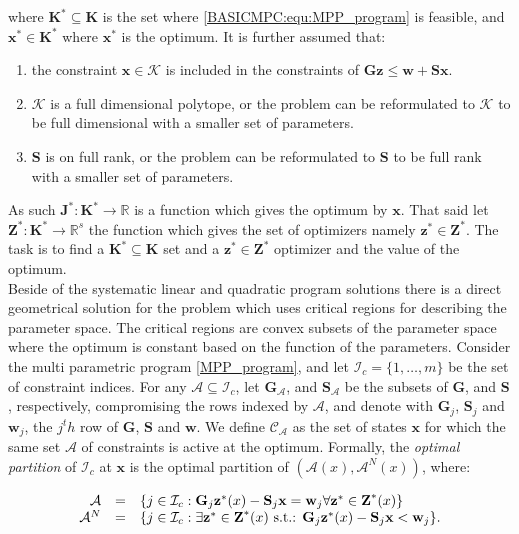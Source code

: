     where $\textbf{K}^*\subseteq\textbf{K}$ is the set where \ref{BASICMPC:equ:MPP_program} is feasible, and $\textbf{x}^*\in\textbf{K}^*$ where $\textbf{x}^*$ is the optimum. It is further assumed that:
    
    \begin{enumerate}
    \item the constraint $\textbf{x}\in\mathcal{K}$ is included in the constraints of $\textbf{Gz}\leq\textbf{w}+\textbf{Sx}$.
    \item $\mathcal{K}$ is a full dimensional polytope, or the problem can be reformulated to $\mathcal{K}$ to be full dimensional with a smaller set of parameters.
    \item $\textbf{S}$ is on full rank, or the problem can be reformulated to $\textbf{S}$ to be full rank with a smaller set of parameters.
    \end{enumerate}
    
    As such $\textbf{J}^*:\textbf{K}^*\rightarrow\mathbb{R}$ is a function which gives the optimum by $\textbf{x}$. That said let $\textbf{Z}^*:\textbf{K}^*\rightarrow\mathbb{R}^s$ the function which gives the set of optimizers namely $\textbf{z}^*\in\textbf{Z}^*$. The task is to find a $\textbf{K}^*\subseteq\textbf{K}$ set and a $\textbf{z}^*\in\textbf{Z}^*$ optimizer and the value of the optimum.\\
    Beside of the systematic linear and quadratic program solutions \cite{borrelli2017predictive} there is a direct geometrical solution for the problem which uses critical regions for describing the parameter space. The critical regions are convex subsets of the parameter space where the optimum is constant based on the function of the parameters. 
    Consider the multi parametric program \ref{MPP_program}, and let $\mathcal{I}_c=\{1,\dots,m\}$ be the set of constraint indices. For any $\mathcal{A}\subseteq\mathcal{I}_c$, let $\textbf{G}_{\mathcal{A}}$, and $\textbf{S}_{\mathcal{A}}$ be the subsets of $\textbf{G}$, and $\textbf{S}$, respectively, compromising the rows indexed by $\mathcal{A}$, and denote with $\textbf{G}_j$, $\textbf{S}_j$ and $\textbf{w}_j$, the $j^th$ row of $\textbf{G}$, $\textbf{S}$ and $\textbf{w}$. We define $\mathcal{C}_{\mathcal{A}}$ as the set of states $\textbf{x}$ for which the same set $\mathcal{A}$ of constraints is active at the optimum. Formally, the \emph{optimal partition} of $\mathcal{I}_c$ at $\textbf{x}$ is the optimal partition of $(\mathcal{A}(x),\mathcal{A}^N(x))$, where:

    \begin{equation}
    \begin{array}{rcl}
            \mathcal{A}&=&\{j\in\mathcal{I}_c:\textbf{G}_j\textbf{z}^*(x)-\textbf{S}_j\textbf{x}=\textbf{w}_j\forall\textbf{z}^*\in\textbf{Z}^*(x)\}\\
            \mathcal{A}^N&=&\{j\in\mathcal{I}_c:\exists\textbf{z}^*\in\textbf{Z}^*(x)\textnormal{ s.t.: }\textbf{G}_j\textbf{z}^*(x)-\textbf{S}_j\textbf{x}<\textbf{w}_j\}.
        \end{array}
        \label{BASICMPC:equ:MPP_stateset_optimal partition}
    \end{equation}
    
